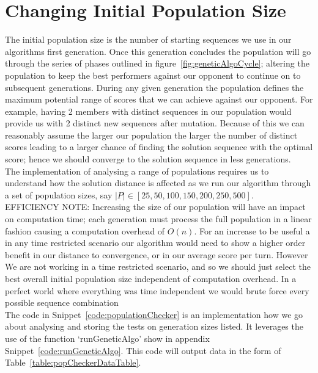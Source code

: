 \section{Changing Initial Population Size}\label{sec:ChangingInitialPopulationSize}
The initial population size is the number of starting sequences we use in our algorithms first generation.
Once this generation concludes the population will go through the series of phases outlined in figure~\ref{fig:geneticAlgoCycle}; altering the population to keep the best performers against our opponent to continue on to subsequent generations.
During any given generation the population defines the maximum potential range of scores that we can achieve against our opponent.
For example, having 2 members with distinct sequences in our population would provide us with 2 distinct new sequences after mutation.
Because of this we can reasonably assume the larger our population the larger the number of distinct scores leading to a larger chance of finding the solution sequence with the optimal score;
hence we should converge to the solution sequence in less generations.\\

The implementation of analysing a range of populations requires us to understand how the solution distance is affected as we run our algorithm through a set of population sizes, say \(|P| \in [25,50,100,150,200,250,500]\).\\

EFFICIENCY NOTE\@: Increasing the size of our population will have an impact on computation time;
each generation must process the full population in a linear fashion causing a computation overhead of \(O(n)\).
For an increase to be useful a in any time restricted scenario our algorithm would need to show a higher order benefit in our distance to convergence, or in our average score per turn.
However We are not working in a time restricted scenario, and so we should just select the best overall initial population size independent of computation overhead.
In a perfect world where everything was time independent we would brute force every possible sequence combination\\

The code in Snippet~\ref{code:populationChecker} is an implementation how we go about analysing and storing the tests on generation sizes listed.
It leverages the use of the function `runGeneticAlgo' show in appendix Snippet~\ref{code:runGeneticAlgo}.
This code will output data in the form of Table~\ref{table:popCheckerDataTable}.\\

